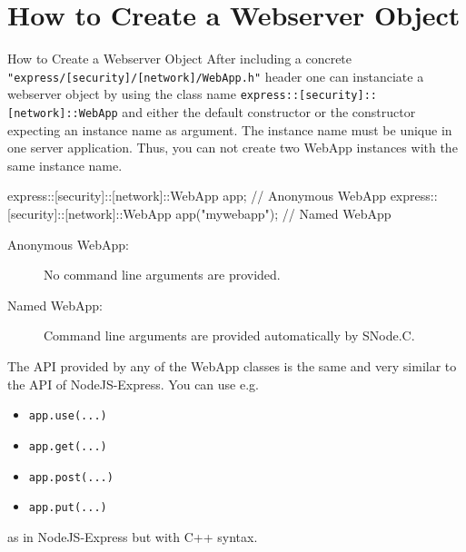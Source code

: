 ﻿\section[nosectionpage]{How to Create a Webserver Object}

\begin{frame}[fragile]{How to Create a Webserver Object}
  After including a concrete \lstinline|"express/[security]/[network]/WebApp.h"| header one can instanciate a webserver object by using the class name \lstinline|express::[security]::[network]::WebApp| and either the \alert{default constructor} or the \alert{constructor expecting} an \alert{instance name} as argument.
  The \alert{instance name} must be \alert{unique} in one server application. Thus, you can \alert{not} create \alert{two WebApp instances} with the \alert{same instance name}.

  \begin{cppcode}[gobble=4]
    express::[security]::[network]::WebApp app;             // Anonymous WebApp
    express::[security]::[network]::WebApp app("mywebapp"); // Named WebApp
  \end{cppcode}
  \begin{description}
    \item [Anonymous WebApp:] No command line arguments are provided.
    \item [Named WebApp:] Command line arguments are provided automatically by SNode.C.
  \end{description}
  The \alert{API} provided by any of the \alert{WebApp} classes is the same and very \alert{similar} to the \alert{API of NodeJS-Express}. You can use e.g.
  \begin{itemize}
    \item \lstinline|app.use(...)|
    \item \lstinline|app.get(...)|
    \item \lstinline|app.post(...)|
    \item \lstinline|app.put(...)|
  \end{itemize}
  as in NodeJS-Express but with C++ syntax.
\end{frame}
